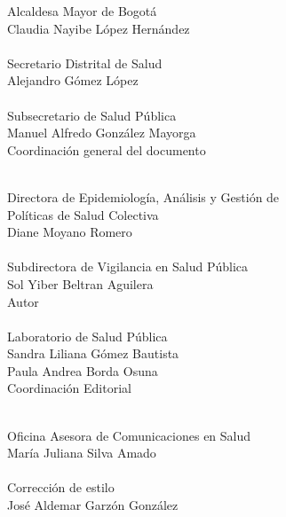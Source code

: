 \documentclass[
]{article}
\author{}
\date{\vspace{-2.5em}2024-11-19}
\begin{document}
\fontsize{11.5}{13}
\selectfont



\begin{center}
{\color{colortitles} Alcaldesa Mayor de Bogotá\\}
Claudia Nayibe López Hernández\\~\\


{\color{colortitles} Secretario Distrital de Salud\\}
Alejandro Gómez López\\~\\


{\color{colortitles} Subsecretario de Salud Pública\\}
Manuel Alfredo González Mayorga\\[0.4in]


{\color{colortitles} Coordinación general del documento\\~\\}


{\color{colortitles} Directora de Epidemiología, Análisis y Gestión de\\ 
Políticas de Salud Colectiva\\}
Diane Moyano Romero\\~\\


{\color{colortitles} Subdirectora de Vigilancia en Salud Pública\\}
Sol Yiber Beltran Aguilera\\[0.5in]


{\color{colortitles} Autor\\~\\}
{\color{colortitles} Laboratorio de Salud Pública\\}
Sandra Liliana Gómez Bautista\\
Paula Andrea Borda Osuna\\[0.6in]


{\color{colortitles} Coordinación Editorial\\~\\}

{\color{colortitles} Oficina Asesora de Comunicaciones en Salud\\}
María Juliana Silva Amado\\~\\


{\color{colortitles} Corrección de estilo\\}
José Aldemar Garzón González\\~\\



\end{center}
\end{document}
